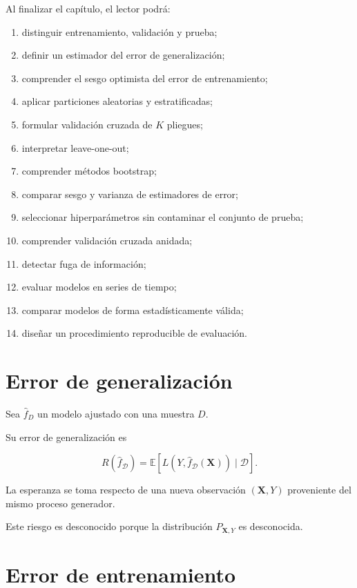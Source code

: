 \documentclass[
  spanish,
  11pt,
  letterpaper,
  DIV=11,
  numbers=noendperiod]{scrreprt}
\providecommand{\tightlist}{%
  \setlength{\itemsep}{0pt}\setlength{\parskip}{0pt}}
\theoremstyle{definition}
\theoremstyle{plain}
\theoremstyle{definition}
\theoremstyle{remark}
\begin{document}
Al finalizar el capítulo, el lector podrá:

\begin{enumerate}
\def\labelenumi{\arabic{enumi}.}
\tightlist
\item
  distinguir entrenamiento, validación y prueba;
\item
  definir un estimador del error de generalización;
\item
  comprender el sesgo optimista del error de entrenamiento;
\item
  aplicar particiones aleatorias y estratificadas;
\item
  formular validación cruzada de \(K\) pliegues;
\item
  interpretar leave-one-out;
\item
  comprender métodos bootstrap;
\item
  comparar sesgo y varianza de estimadores de error;
\item
  seleccionar hiperparámetros sin contaminar el conjunto de prueba;
\item
  comprender validación cruzada anidada;
\item
  detectar fuga de información;
\item
  evaluar modelos en series de tiempo;
\item
  comparar modelos de forma estadísticamente válida;
\item
  diseñar un procedimiento reproducible de evaluación.
\end{enumerate}

\section{Error de generalización}\label{error-de-generalizaciuxf3n}

Sea \(\widehat{f}_{D}\) un modelo ajustado con una muestra \(D\).

Su error de generalización es

\[
R(\widehat{f}_{\mathcal{D}})
=
\mathbb{E}
\left[
L
\left(
Y,
\widehat{f}_{\mathcal{D}}(\mathbf{X})
\right)
\mid
\mathcal{D}
\right].
\]

La esperanza se toma respecto de una nueva observación
\((\mathbf{X},Y)\) proveniente del mismo proceso generador.

Este riesgo es desconocido porque la distribución \(P_{\mathbf{X},Y}\)
es desconocida.

\section{Error de entrenamiento}\label{error-de-entrenamiento-1}
\end{document}
